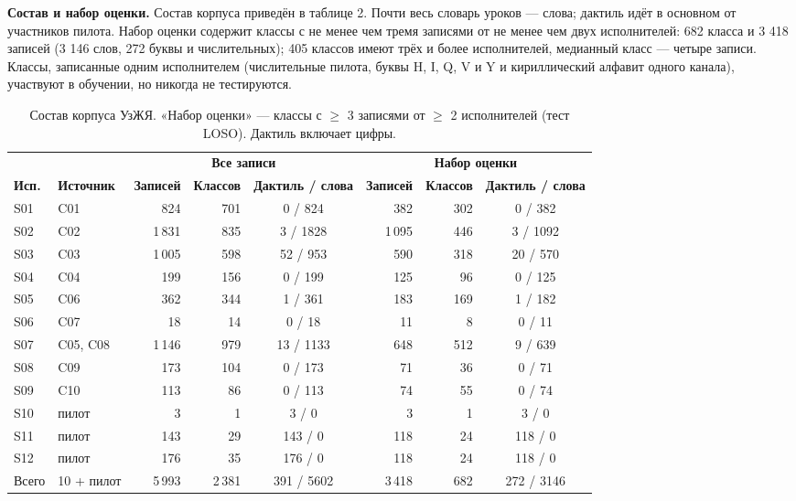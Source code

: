 \documentclass[a4paper,fleqn]{cas-dc}
\begin{document}
\textbf{Состав и набор оценки.} Состав корпуса приведён в таблице 2. Почти весь словарь уроков --- слова; дактиль идёт в основном от участников пилота. Набор оценки содержит классы с не менее чем тремя записями от не менее чем двух исполнителей: 682 класса и 3 418 записей (3 146 слов, 272 буквы и числительных); 405 классов имеют трёх и более исполнителей, медианный класс --- четыре записи. Классы, записанные одним исполнителем (числительные пилота, буквы H, I, Q, V и Y и кириллический алфавит одного канала), участвуют в обучении, но никогда не тестируются.

\begin{table}[t]
\caption{Состав корпуса УзЖЯ. «Набор оценки» — классы с $\geq$ 3 записями от $\geq$ 2 исполнителей (тест LOSO). Дактиль включает цифры.}\label{tab:corpus}
\footnotesize\setlength{\tabcolsep}{4pt}
\centering
\begin{tabular}{llrrcrrc}
\toprule
& & \multicolumn{3}{c}{\textbf{Все записи}} & \multicolumn{3}{c}{\textbf{Набор оценки}} \\ \cmidrule(lr){3-5}\cmidrule(lr){6-8}
\textbf{Исп.} & \textbf{Источник} & \textbf{Записей} & \textbf{Классов} & \textbf{Дактиль / слова} & \textbf{Записей} & \textbf{Классов} & \textbf{Дактиль / слова} \\
\midrule
S01 & C01 & 824 & 701 & 0 / 824 & 382 & 302 & 0 / 382 \\
S02 & C02 & 1\,831 & 835 & 3 / 1828 & 1\,095 & 446 & 3 / 1092 \\
S03 & C03 & 1\,005 & 598 & 52 / 953 & 590 & 318 & 20 / 570 \\
S04 & C04 & 199 & 156 & 0 / 199 & 125 & 96 & 0 / 125 \\
S05 & C06 & 362 & 344 & 1 / 361 & 183 & 169 & 1 / 182 \\
S06 & C07 & 18 & 14 & 0 / 18 & 11 & 8 & 0 / 11 \\
S07 & C05, C08 & 1\,146 & 979 & 13 / 1133 & 648 & 512 & 9 / 639 \\
S08 & C09 & 173 & 104 & 0 / 173 & 71 & 36 & 0 / 71 \\
S09 & C10 & 113 & 86 & 0 / 113 & 74 & 55 & 0 / 74 \\
S10 & пилот & 3 & 1 & 3 / 0 & 3 & 1 & 3 / 0 \\
S11 & пилот & 143 & 29 & 143 / 0 & 118 & 24 & 118 / 0 \\
S12 & пилот & 176 & 35 & 176 / 0 & 118 & 24 & 118 / 0 \\
Всего & 10 + пилот & 5\,993 & 2\,381 & 391 / 5602 & 3\,418 & 682 & 272 / 3146 \\
\bottomrule
\end{tabular}
\end{table}
\end{document}
